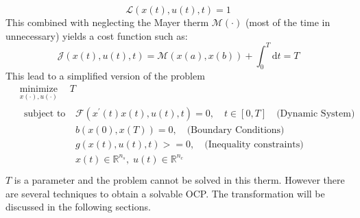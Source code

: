 %
\begin{equation}
    \mathcal{L}(x(t), u(t), t) = 1
\end{equation}
%
This combined with neglecting the Mayer therm $\mathcal{M}(\cdot)$ (most of the time in unnecessary) yields a cost function such as:
%
\begin{equation}
    \mathcal{J}(x(t), u(t), t) = \mathcal{M}(x(a), x(b))+\int_{0}^{T}  \mathrm{d} t = T 
\end{equation}
%
This lead to a simplified version of the problem
%
\begin{equation}
    \begin{aligned}
    &\underset{x(\cdot), u(\cdot)}{\operatorname{minimize}} \quad T \\
    &\begin{aligned}
        {\text { subject to }} \;
        & \mathcal{F}(x^{\prime}(t)x(t),u(t),t)=0, \quad t \in[0, T] \quad \text{(Dynamic System)}\\
        & b(x(0),x(T))=0, \quad \text{(Boundary Conditions)}\\
        & g(x(t),u(t),t)>=0, \quad \text{(Inequality constraints)}\\
        & x(t) \in \mathbb{R}^{n_s}, \; u(t) \in \mathbb{R}^{n_c}
    \end{aligned}\\
    \end{aligned}
    \label{eq:OCPminT}
\end{equation}
%
$T$ is a parameter and the problem cannot be solved in this therm. However there are several techniques to obtain a solvable OCP. The transformation will be discussed in the following sections.
